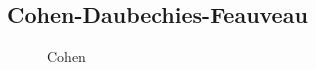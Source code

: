 \pagebreak
\subsection{Cohen-Daubechies-Feauveau}

\begin{figure}[!htb]\centering
    \begin{minipage}{0.8\textwidth}
        \caption{\small{Cohen}}
    \end{minipage}
\end{figure}

